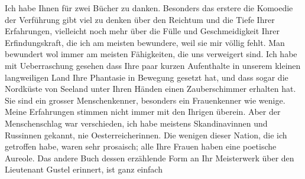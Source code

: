 \begin{ledgroupsized}[t]{13cm}
           Ich habe Ihnen für zwei Bücher zu danken. Besonders das erstere die Komoedie der Verführung gibt viel zu denken über den Reichtum und die Tiefe
               Ihrer Erfahrungen, vielleicht noch mehr über die Fülle und Geschmeidigkeit Ihrer
               Erfindungskraft, die ich am meisten bewundere, weil sie mir völlig fehlt. Man
               bewundert {\pb}wol immer am meisten
               Fähigkeiten, die uns verweigert sind.\pend
           \pstart
           Ich habe mit Ueberraschung gesehen dass Ihre paar kurzen Aufenthalte in unserem
               kleinen langweiligen Land
               Ihre Phantasie in Bewegung gesetzt hat, und dass sogar die Nordküste von Seeland unter Ihren Händen einen Zauberschimmer erhalten hat.\pend
           \pstart
           Sie sind ein grosser Menschenkenner, besonders ein Frauenkenner wie wenige. Meine
               Erfahrungen stimmen nicht immer mit den Ihrigen überein. Aber der Menschenschlag war
               verschieden, ich habe meistens Skandinavinnen und
                  Russinnen gekannt, nie Oesterreicherinnen. Die wenigen dieser Nation, die ich getroffen
               habe, waren sehr prosaisch; alle Ihre Frauen haben eine poetische Aureole.\pend
           \pstart
           Das andere Buch dessen
               erzählende Form an Ihr Meisterwerk über den {\pb}Lieutenant Gustel erinnert, ist ganz einfach

\end{ledgroupsized}
